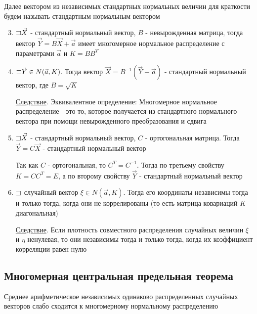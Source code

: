 \documentclass[12pt]{article}
\begin{document}
Далее вектором из независимых стандартных нормальных величин для краткости будем называть стандартным нормальным вектором

\begin{enumerate}
    \setcounter{enumi}{2}

    \item $\mathord{\sqsupset} \vec X$ - стандартный нормальный вектор, $B$ - невырожденная матрица, 
    тогда вектор $\vec Y = B \vec X + \vec a$ имеет многомерное нормальное распределение с параметрами $\vec a$ и $K = B B^T$

    \item $\mathord{\sqsupset} \vec Y \in N(\vec a, K)$. Тогда вектор $\vec X = B^{-1} (\vec Y - \vec a)$ - стандартный нормальный вектор, где $B = \sqrt{K}$

    \underline{Следствие}. Эквивалентное определение: Многомерное нормальное распределение - это то, которое получается из
    стандартного нормального вектора при помощи невырожденного преобразования и сдвига

    \item $\mathord{\sqsupset} \vec X$ - стандартный нормальный вектор, $C$ - ортогональная матрица. Тогда $\vec Y = C \vec X$ - стандартный нормальный вектор

    \begin{MyProof}
        Так как $C$ - ортогональная, то $C^T = C^{-1}$. Тогда по третьему свойству $K = C C^T = E$, а по второму свойству $\vec Y$ - стандартный нормальный вектор
    \end{MyProof}

    \item $\mathord{\sqsupset}$ случайный вектор $\xi \in N(\vec a, K)$.
    Тогда его координаты независимы тогда и только тогда, когда они не коррелированы (то есть матрица ковариаций $K$ диагональная)

    \underline{Следствие}. Если плотность совместного распределения случайных величин $\xi$ и $\eta$ ненулевая, то они независимы тогда и только тогда, 
    когда их коэффициент корреляции равен нулю
\end{enumerate}

\subsection{Многомерная центральная предельная теорема}

\begin{MyTheorem} 
    \Ths Среднее арифметическое независимых одинаково распределенных случайных векторов слабо сходится к многомерному нормальному распределению
\end{MyTheorem}
\end{document}
